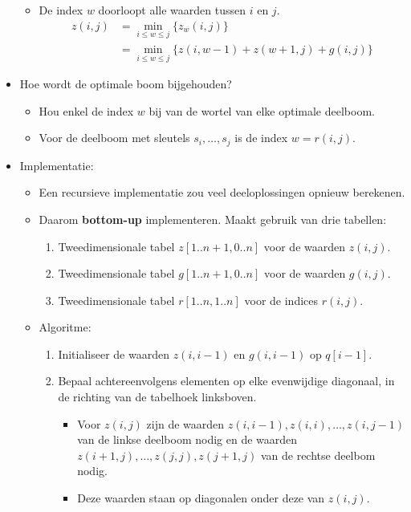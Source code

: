\begin{itemize}
    \begin{itemize}
        \item De index $w$ doorloopt alle waarden tussen $i$ en $j$.
        \begin{align*}
            z(i, j) & = \min_{i \leq w \leq j} \{ z_w(i, j)\} \\
                    & = \min_{i \leq w \leq j} \{ z(i , w - 1) + z(w + 1, j) + g(i, j)\}
        \end{align*}
    \end{itemize}
    \item Hoe wordt de optimale boom bijgehouden?
    \begin{itemize}
        \item Hou enkel de index $w$ bij van de wortel van elke optimale deelboom.
        \item Voor de deelboom met sleutels $s_i, \dots, s_j$ is  de index $w = r(i, j)$.
    \end{itemize}
    \item Implementatie:
    \begin{itemize}
        \item Een recursieve implementatie zou veel deeloplossingen opnieuw berekenen.
        \item Daarom \textbf{bottom-up} implementeren. Maakt gebruik van drie tabellen:
        \begin{enumerate}
            \item Tweedimensionale tabel $z[1..n + 1, 0..n]$ voor de waarden $z(i, j)$.
            \item Tweedimensionale tabel $g[1..n + 1, 0..n]$ voor de waarden $g(i, j)$.
            \item Tweedimensionale tabel $r[1..n, 1..n]$ voor de indices $r(i, j)$.
            
        \end{enumerate}
        \item Algoritme:
        \begin{enumerate}
            \item Initialiseer de waarden $z(i, i-1)$ en $g(i, i-1)$ op $q[i - 1]$.
            \item Bepaal achtereenvolgens elementen op elke evenwijdige diagonaal, in de richting van de tabelhoek linksboven.
            \begin{itemize}
                \item Voor $z(i, j)$ zijn de waarden $z(i, i-1), z(i, i), \dots, z(i, j-1)$ van de linkse deelboom nodig en de waarden $z(i + 1, j), \dots, z(j, j), z(j + 1, j)$ van de rechtse deelbom nodig.
                \item Deze waarden staan op diagonalen onder deze van $z(i, j)$.
            \end{itemize}
        \end{enumerate}
    \end{itemize}


\end{itemize}
